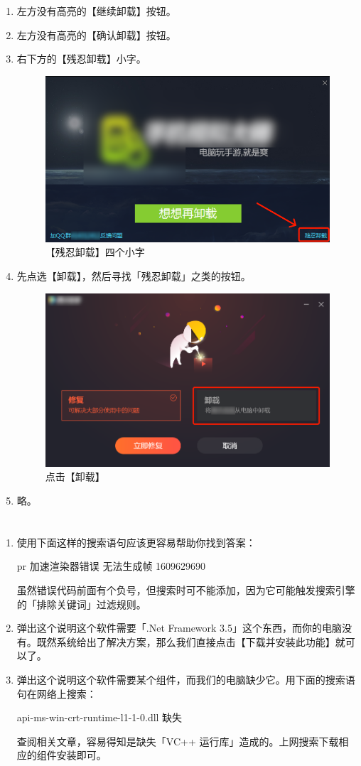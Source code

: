 \begin{enumerate}
  \item 左方没有高亮的【继续卸载】按钮。
  \item 左方没有高亮的【确认卸载】按钮。
  \item 右下方的【残忍卸载】小字。
    \begin{figure}[htb!]
      \centering
      \includegraphics[width=.55\textwidth]{assets/appendix/BasicMaint_3.png}
      \caption{【残忍卸载】四个小字}
      \label{fig:BasicMaint_3}
    \end{figure}
  \item 先点选【卸载】，然后寻找「残忍卸载」之类的按钮。
    \begin{figure}[htb!]
      \centering
      \includegraphics[width=.55\textwidth]{assets/appendix/BasicMaint_4.png}
      \caption{点击【卸载】}
      \label{fig:BasicMaint_4}
    \end{figure}
  \item 略。
\end{enumerate}

\section{}

\begin{enumerate}
  \item 使用下面这样的搜索语句应该更容易帮助你找到答案：
    \begin{quoting}
      pr 加速渲染器错误 无法生成帧 1609629690
    \end{quoting}
    虽然错误代码前面有个负号，但搜索时可不能添加，因为它可能触发搜索引擎的「排除关键词」过滤规则。
  \item 弹出这个说明这个软件需要「.Net Framework 3.5」这个东西，而你的电脑没有。既然系统给出了解决方案，那么我们直接点击【下载并安装此功能】就可以了。
  \item 弹出这个说明这个软件需要某个组件，而我们的电脑缺少它。用下面的搜索语句在网络上搜索：
    \begin{quoting}
      api-ms-win-crt-runtime-l1-1-0.dll 缺失
    \end{quoting}
    查阅相关文章，容易得知是缺失「VC++ 运行库」造成的。上网搜索下载相应的组件安装即可。
\end{enumerate}

